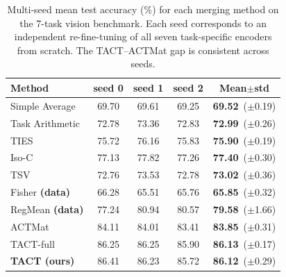 \begin{table}[h]
\caption{Multi-seed mean test accuracy (\%) for each merging method on the 7-task vision benchmark. Each seed corresponds to an independent re-fine-tuning of all seven task-specific encoders from scratch. The TACT--ACTMat gap is consistent across seeds.}
\label{tab:seeds}
\centering
\small
\setlength{\tabcolsep}{4pt}
\begin{tabular}{lcccc}
\toprule
Method & seed 0 & seed 1 & seed 2 & \textbf{Mean$\pm$std} \\
\midrule
Simple Average & 69.70 & 69.61 & 69.25 & \textbf{69.52}~\footnotesize($\pm$0.19) \\
Task Arithmetic & 72.78 & 73.36 & 72.83 & \textbf{72.99}~\footnotesize($\pm$0.26) \\
TIES & 75.72 & 76.16 & 75.83 & \textbf{75.90}~\footnotesize($\pm$0.19) \\
Iso-C & 77.13 & 77.82 & 77.26 & \textbf{77.40}~\footnotesize($\pm$0.30) \\
TSV & 72.76 & 73.53 & 72.78 & \textbf{73.02}~\footnotesize($\pm$0.36) \\
Fisher \textbf{(data)} & 66.28 & 65.51 & 65.76 & \textbf{65.85}~\footnotesize($\pm$0.32) \\
RegMean \textbf{(data)} & 77.24 & 80.94 & 80.57 & \textbf{79.58}~\footnotesize($\pm$1.66) \\
ACTMat & 84.11 & 84.01 & 83.41 & \textbf{83.85}~\footnotesize($\pm$0.31) \\
TACT-full & 86.25 & 86.25 & 85.90 & \textbf{86.13}~\footnotesize($\pm$0.17) \\
\textbf{TACT (ours)} & 86.41 & 86.23 & 85.72 & \textbf{86.12}~\footnotesize($\pm$0.29) \\
\bottomrule
\end{tabular}
\end{table}